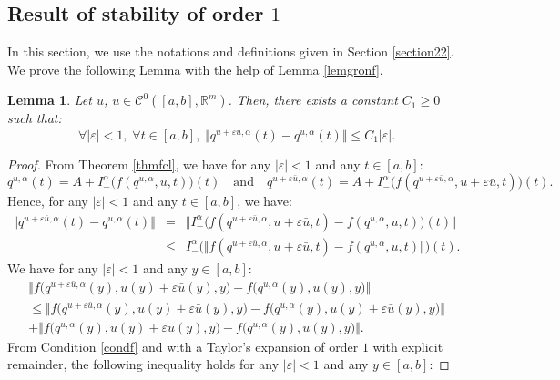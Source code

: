 \documentclass[english,11pt,reqno]{smfart}
\newtheorem{lemma}[theorem]{Lemma}
\def\eps{\varepsilon}
\newcommand{\R}{\mathbb{R}}
\newcommand{\CC}{\mathscr{C}}
\newcommand{\abs}[1]{\left\vert #1 \right\vert}
\begin{document}
\subsection{Result of stability of order $1$}\label{appAb}
In this section, we use the notations and definitions given in Section \ref{section22}. We prove the following Lemma with the help of Lemma \ref{lemgronf}.
\begin{lemma}\label{lemappA1}
Let $u$, $\bar{u} \in \CC^0 ([a,b],\R^m)$. Then, there exists a constant $C_1 \geq 0$ such that:
\begin{equation}
\forall \vert \eps \vert < 1, \; \forall t \in [a,b], \; \Vert q^{u+ \eps \bar{u},\alpha} (t) - q^{u,\alpha}(t) \Vert \leq C_1 \vert \eps \vert .
\end{equation}
\end{lemma}
\begin{proof}
From Theorem \ref{thmfcl}, we have for any $\abs{\eps} < 1$ and any $t \in [a,b]$:
\begin{equation}
q^{u,\alpha} (t) = A + I^{\alpha}_- \big( f( q^{u,\alpha},u,t ) \big) (t) \quad \text{and} \quad q^{u+ \eps \bar{u},\alpha} (t) = A + I^{\alpha}_- \big( f( q^{u+ \eps \bar{u},\alpha},u+ \eps \bar{u},t ) \big) (t).
\end{equation}
Hence, for any $\abs{\eps} < 1$ and any $t \in [a,b]$, we have:
\begin{eqnarray}
\Vert q^{u+ \eps \bar{u},\alpha} (t) -  q^{u,\alpha} (t) \Vert & = & \Vert I^{\alpha}_- \big( f( q^{u+ \eps \bar{u},\alpha},u+ \eps \bar{u},t ) - f( q^{u,\alpha},u,t ) \big) (t) \Vert  \\ \label{eqAb-1}
& \leq & I^{\alpha}_- \Big( \Vert f( q^{u+ \eps \bar{u},\alpha},u+ \eps \bar{u},t ) - f( q^{u,\alpha},u,t ) \Vert \Big) (t) . \label{eqAb-2}
\end{eqnarray}
We have for any $\abs{\eps} < 1$ and any $y \in [a,b]$:
\begin{multline}
\Vert f\big( q^{u+ \eps \bar{u},\alpha}(y),u(y)+ \eps \bar{u}(y),y \big) - f\big( q^{u,\alpha}(y),u(y),y \big) \Vert \\ \leq \Vert f\big( q^{u+ \eps \bar{u},\alpha}(y),u(y)+ \eps \bar{u}(y),y \big) - f\big( q^{u,\alpha}(y),u(y)+ \eps \bar{u}(y),y \big) \Vert \\ +  \Vert f\big( q^{u,\alpha}(y),u(y)+ \eps \bar{u}(y),y \big) - f\big( q^{u,\alpha}(y),u(y),y \big) \Vert.
\end{multline}
From Condition \eqref{condf} and with a Taylor's expansion of order $1$ with explicit remainder, the following inequality holds for any $\abs{\eps} < 1$ and any $y \in [a,b]$:

\end{proof}
\end{document}
